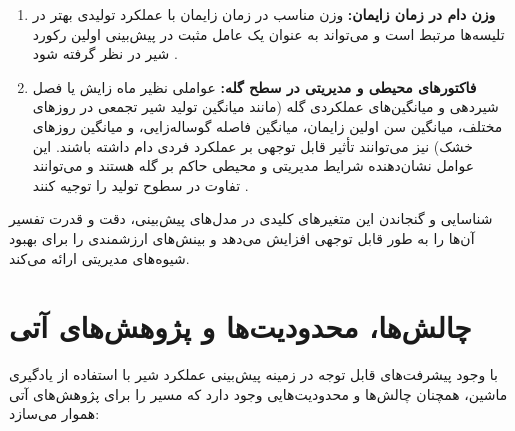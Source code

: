 \begin{enumerate}
	\item \textbf{وزن دام در زمان زایمان:} وزن مناسب در زمان زایمان با عملکرد تولیدی بهتر در تلیسه‌ها مرتبط است و می‌تواند به عنوان یک عامل مثبت در پیش‌بینی اولین رکورد شیر در نظر گرفته شود \cite{Dallago2019}.
	
	\item \textbf{فاکتورهای محیطی و مدیریتی در سطح گله:} عواملی نظیر ماه زایش یا فصل شیردهی و میانگین‌های عملکردی گله (مانند میانگین تولید شیر تجمعی در روزهای مختلف، میانگین سن اولین زایمان، میانگین فاصله گوساله‌زایی، و میانگین روزهای خشک) نیز می‌توانند تأثیر قابل توجهی بر عملکرد فردی دام داشته باشند. این عوامل نشان‌دهنده شرایط مدیریتی و محیطی حاکم بر گله هستند و می‌توانند تفاوت در سطوح تولید را توجیه کنند \cite{Salamone2022, GuevaraEscobar2022}.
\end{enumerate}	
شناسایی و گنجاندن این متغیرهای کلیدی در مدل‌های پیش‌بینی، دقت و قدرت تفسیر آن‌ها را به طور قابل توجهی افزایش می‌دهد و بینش‌های ارزشمندی را برای بهبود شیوه‌های مدیریتی ارائه می‌کند.
	
\section{چالش‌ها، محدودیت‌ها و پژوهش‌های آتی}
با وجود پیشرفت‌های قابل توجه در زمینه پیش‌بینی عملکرد شیر با استفاده از یادگیری ماشین، همچنان چالش‌ها و محدودیت‌هایی وجود دارد که مسیر را برای پژوهش‌های آتی هموار می‌سازد:
	
